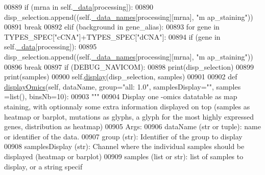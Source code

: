 \begin{DoxyCode}
00889                 \textcolor{keywordflow}{if} (mrna \textcolor{keywordflow}{in} self.\hyperlink{classnavicom_1_1navicom_1_1NaviCom_a407b2b5c30a5652ee85c4be54b3e6679}{_data}[processing]):
00890                     disp\_selection.append((self.\hyperlink{classnavicom_1_1navicom_1_1NaviCom_ab8c34ab1a6d2a23f9b9ecee65375317a}{_data_names}[processing][mrna], \textcolor{stringliteral}{"m
      ap\_staining"}))
00891                     \textcolor{keywordflow}{break}
00892         \textcolor{keywordflow}{elif} (background \textcolor{keywordflow}{in} gene\_alias):
00893             \textcolor{keywordflow}{for} gene \textcolor{keywordflow}{in} TYPES\_SPEC[\textcolor{stringliteral}{"cCNA"}]+TYPES\_SPEC[\textcolor{stringliteral}{"dCNA"}]:
00894                 \textcolor{keywordflow}{if} (gene \textcolor{keywordflow}{in} self.\hyperlink{classnavicom_1_1navicom_1_1NaviCom_a407b2b5c30a5652ee85c4be54b3e6679}{_data}[processing]):
00895                     disp\_selection.append((self.\hyperlink{classnavicom_1_1navicom_1_1NaviCom_ab8c34ab1a6d2a23f9b9ecee65375317a}{_data_names}[processing][mrna], \textcolor{stringliteral}{"m
      ap\_staining"}))
00896                     \textcolor{keywordflow}{break}
00897         \textcolor{keywordflow}{if} (DEBUG\_NAVICOM):
00898             \textcolor{keywordflow}{print}(disp\_selection)
00899             \textcolor{keywordflow}{print}(samples)
00900         self.\hyperlink{classnavicom_1_1navicom_1_1NaviCom_ad7d4390d700d4a6d2533647887f8ab94}{display}(disp\_selection, samples)
00901 
00902     \textcolor{keyword}{def }\hyperlink{classnavicom_1_1navicom_1_1NaviCom_a01066363389ca01c24f683956f3dc9ad}{displayOmics}(self, dataName, group="all: 1.0\textcolor{stringliteral}{", samplesDisplay="}\textcolor{stringliteral}{", samples
      =list(), binsNb=10):}
00903 \textcolor{stringliteral}{        }\textcolor{stringliteral}{"""}
00904 \textcolor{stringliteral}{        Display one -omics datatable as map staining, with optionnaly some extra 
      information displayed on top (samples as heatmap or barplot, mutations as glyphs,
       a glyph for the most highly expressed genes, distribution as heatmap)}
00905 \textcolor{stringliteral}{        Args:}
00906 \textcolor{stringliteral}{            dataName (str or tuple): name or identifier of the data.}
00907 \textcolor{stringliteral}{            group (str): Identifier of the group to display}
00908 \textcolor{stringliteral}{            samplesDisplay (str): Channel where the individual samples should be 
      displayed (heatmap or barplot)}
00909 \textcolor{stringliteral}{            samples (list or str): list of samples to display, or a string specif
}
\end{DoxyCode}
